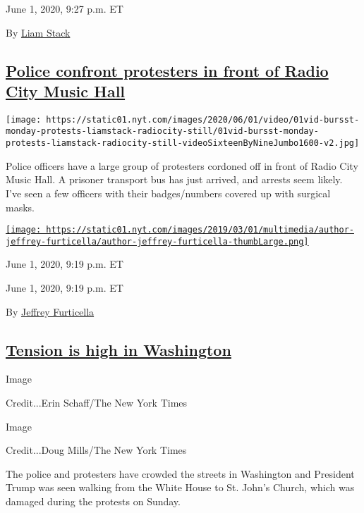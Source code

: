 June 1, 2020, 9:27 p.m. ET

By \href{https://www.nytimes.com/by/liam-stack}{Liam Stack}

\hypertarget{police-confront-protesters-in-front-of-radio-city-music-hall}{%
\subsection{\texorpdfstring{\protect\hyperlink{police-confront-protesters-in-front-of-radio-city-music-hall}{Police
confront protesters in front of Radio City Music
Hall}}{Police confront protesters in front of Radio City Music Hall}}\label{police-confront-protesters-in-front-of-radio-city-music-hall}}

\texttt{[image: https://static01.nyt.com/images/2020/06/01/video/01vid-bursst-monday-protests-liamstack-radiocity-still/01vid-bursst-monday-protests-liamstack-radiocity-still-videoSixteenByNineJumbo1600-v2.jpg]}

Police officers have a large group of protesters cordoned off in front
of Radio City Music Hall. A prisoner transport bus has just arrived, and
arrests seem likely. I've seen a few officers with their badges/numbers
covered up with surgical masks.

\href{https://www.nytimes.com/by/jeffrey-furticella}{\texttt{[image: https://static01.nyt.com/images/2019/03/01/multimedia/author-jeffrey-furticella/author-jeffrey-furticella-thumbLarge.png]}}

June 1, 2020, 9:19 p.m. ET

June 1, 2020, 9:19 p.m. ET

By \href{https://www.nytimes.com/by/jeffrey-furticella}{Jeffrey
Furticella}

\hypertarget{tension-is-high-in-washington}{%
\subsection{\texorpdfstring{\protect\hyperlink{tension-is-high-in-washington}{Tension
is high in
Washington}}{Tension is high in Washington}}\label{tension-is-high-in-washington}}

Image

Credit...Erin Schaff/The New York Times

Image

Credit...Doug Mills/The New York Times

The police and protesters have crowded the streets in Washington and
President Trump was seen walking from the White House to St. John's
Church, which was damaged during the protests on Sunday.

